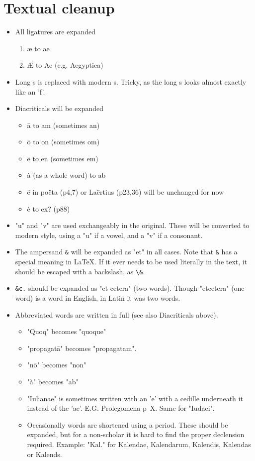 \documentclass{report}
\begin{document}
\section{Textual cleanup}
\label{sec:textual_cleanup}
\begin{itemize}
\item All ligatures are expanded
	\begin{enumerate}
	\item æ to ae
	\item Æ to Ae (e.g. Aegyptica)
	\end{enumerate}

\item Long s is replaced with modern s. Tricky, as the long s looks almost
exactly like an 'f'.

\item Diacriticals will be expanded
	\begin{itemize}
	\item ā to am (sometimes an)
	\item ō to on (sometimes om)
	\item ē to en (sometimes em)
	\item à (as a whole word) to ab
	\item ë in poëta (p4,7) or Laërtius (p23,36) will be unchanged for now
	\item è to ex? (p88)
	\end{itemize}

\item "u" and "v" are used exchangeably in the original.
These will be converted to modern style,
 using a "u" if a vowel, and a "v" if a consonant.

\item The ampersand \verb+&+ will be expanded as "et" in all cases.
 Note that \verb+&+ has a special meaning in \LaTeX. If it ever needs to be
 used literally in the text, it should be escaped with a backslash, as
 \verb+\&+.

\item \verb+&c.+ should be expanded as "et cetera" (two words). Though
 "etcetera" (one word) is a word in English, in Latin it was two words.

\item Abbreviated words are written in full
 (see also Diacriticals above).
	\begin{itemize}
	\item "Quoq" becomes "quoque"
	\item "propagatā" becomes "propagatam".
	\item "nō" becomes "non"
	\item "à" becomes "ab"
	\item "Iulianae" is sometimes written with an 'e' with a cedille underneath
	 it instead of the 'ae'. E.G. Prolegomena p~\textsc{X}.
	 Same for "Iudaei".
	\item Occasionally words are shortened using a period. These should be
	expanded, but for a non-scholar it is hard to find the proper declension
	required.
	Example: "Kal." for Kalendae, Kalendarum, Kalendis, Kalendas or Kalends.
	\end{itemize}


\end{itemize}
\end{document}
